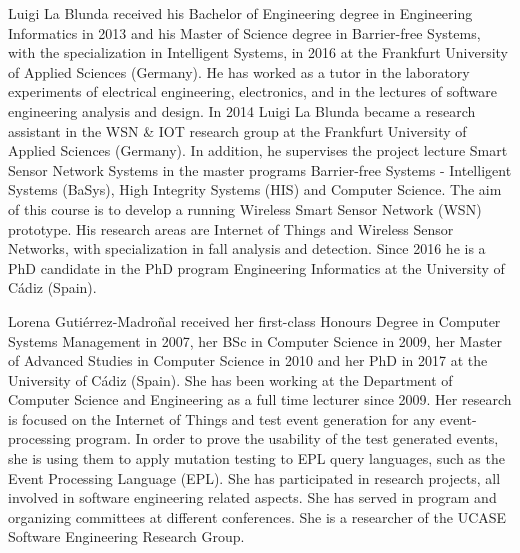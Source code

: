 \documentclass[10pt,journal,compsoc]{IEEEtran}
\begin{document}
\begin{IEEEbiography}{Luigi La Blunda}
 received his Bachelor of Engineering degree in Engineering Informatics in 2013 and his Master of Science degree in Barrier-free Systems, with the specialization in Intelligent Systems, in 2016 at the Frankfurt University of Applied Sciences (Germany). He has worked as a tutor in the laboratory experiments of electrical engineering, electronics, and in the lectures of software engineering analysis and design. In 2014 Luigi La Blunda became a research assistant in the WSN \& IOT research group at the Frankfurt University of Applied Sciences (Germany). In addition, he supervises the project lecture Smart Sensor Network Systems in the master programs Barrier-free Systems - Intelligent Systems (BaSys), High Integrity Systems (HIS) and Computer Science. The aim of this course is to develop a running Wireless Smart Sensor Network (WSN) prototype.  His research areas are Internet of Things and Wireless Sensor Networks, with specialization in fall analysis and detection. Since 2016 he is a PhD candidate in the PhD program Engineering Informatics at the University of C\'adiz (Spain).
\end{IEEEbiography}
\begin{IEEEbiography}{Lorena Guti\'errez-Madro\~nal}
	received her first-class Honours Degree in Computer Systems Management in 2007, her BSc in Computer Science in 2009, her Master of Advanced Studies in Computer Science in 2010 and her PhD in 2017 at the University of C\'adiz (Spain). She has been working at the Department of Computer Science and Engineering as a full time lecturer since 2009. Her research is focused on the Internet of Things and test event generation for any event-processing program. In order to prove the usability of the test generated events, she is using them to apply mutation testing to EPL query languages, such as the Event Processing Language (EPL). She has participated in research projects, all involved in software engineering related aspects. She has served in program and organizing committees at different conferences. She is a researcher of the UCASE Software Engineering Research Group. 
\end{IEEEbiography}
\end{document}
